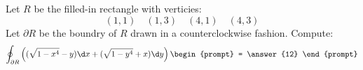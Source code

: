 \documentclass{ximera}
\begin{document}
\begin{exercise}
  Let $R$ be the filled-in rectangle with verticies:
  \[
  (1,1)\quad(1,3)\quad (4,1) \quad (4,3)
  \]
  Let $\partial R$ be the boundry of $R$ drawn in a
  counterclockwise fashion. Compute:
  \[
  \oint_{\partial R} \left( (\sqrt{1-x^4}-y)\d x + (\sqrt{1-y^4}+x)\d y\right)
  \begin{prompt}
    = \answer{12}
  \end{prompt}
  \]
\end{exercise}
\end{document}
